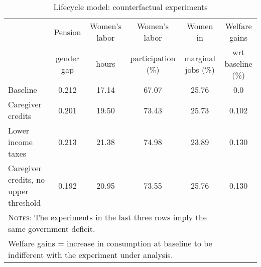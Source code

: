 \begin{table}[htbp]\caption{Lifecycle model: counterfactual experiments}\label{table:experiments}\centering\footnotesize\begin{tabular}{lccccc} \toprule & Pension & Women's labor & Women's labor & Women in &  Welfare gains  \\&gender gap &hours &  participation  (\%) & marginal jobs (\%)  & wrt baseline (\%)  \\\midrule    Baseline                                   &0.212&17.14&67.07&25.76& 0.0\\ Caregiver credits                          &0.201&19.50&73.43&25.73&0.102\\ Lower income taxes                         &0.213&21.38&74.98&23.89&0.130\\ Caregiver credits, no upper threshold      &0.192&20.95&73.55&25.76&0.130\\ \bottomrule\multicolumn{5}{l}{\textsc{Notes:} The experiments in the last three rows imply the same government deficit.}\\\multicolumn{5}{l}{Welfare gains = increase in consumption at baseline to be indifferent with the experiment under analysis. }\end{tabular}
      \end{table}